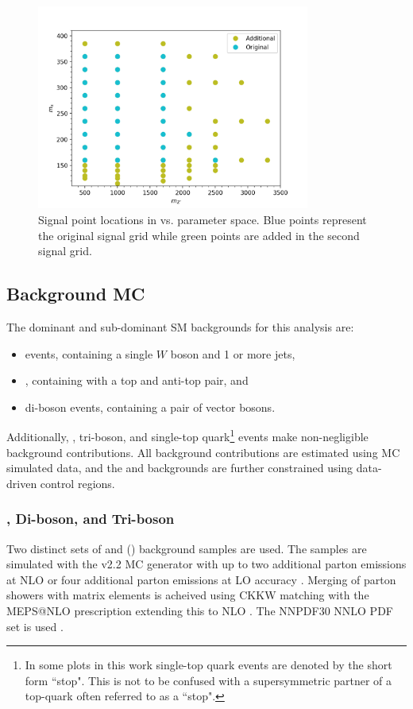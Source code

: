\begin{figure}[H]
    \centering
    \includegraphics[width=0.8\textwidth]{Figures/3/SignalGrid.png}
    \caption{Signal point locations in \ms vs. \mZp parameter space. Blue points represent the original signal grid while green points are added in the second signal grid.}
    \label{fig:signal_grid}
\end{figure}

\subsection{Background MC}
\label{subsection:mc_bkg}
The dominant and sub-dominant SM backgrounds for this analysis are:
\begin{itemize}
    \item \wjets events, containing a single $W$ boson and 1 or more jets,
    \item \ttbar, containing with a top and anti-top pair, and
    \item di-boson events, containing a pair of vector bosons.
\end{itemize}
Additionally, \zjets, tri-boson, and single-top quark\footnote{In some plots in this work single-top quark events are denoted by the short form ``stop". This is not to be confused with a supersymmetric partner of a top-quark often referred to as a ``stop".} events make non-negligible background contributions. All background contributions are estimated using MC simulated data, and the \wjets and \ttbar backgrounds are further constrained using data-driven control regions.

\subsubsection{\vjets, Di-boson, and Tri-boson}
Two distinct sets of \wjets and \zjets (\vjets) background samples are used. The samples are simulated with the \sherpa v2.2 MC generator \cite{Sherpa} with up to two additional parton emissions at NLO or four additional parton emissions at LO accuracy \cite{VJets}\cite{VJets_mW}. Merging of parton showers with matrix elements is acheived using CKKW \cite{CKKW} matching with the MEPS@NLO prescription extending this to NLO \cite{MEPS}. The NNPDF30 NNLO PDF set is used \cite{PDF30}.

